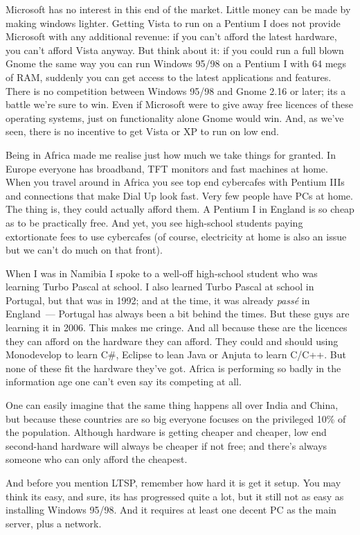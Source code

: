 \documentclass{book}
\begin{document}
Microsoft has no interest in this end of the market. Little money can
be made by making windows lighter. Getting Vista to run on a Pentium I
does not provide Microsoft with any additional revenue: if you can't
afford the latest hardware, you can't afford Vista anyway. But think
about it: if you could run a full blown Gnome the same way you can run
Windows 95/98 on a Pentium I with 64 megs of RAM, suddenly you can get
access to the latest applications and features. There is no
competition between Windows 95/98 and Gnome 2.16 or later; its a
battle we're sure to win. Even if Microsoft were to give away free
licences of these operating systems, just on functionality alone Gnome
would win. And, as we've seen, there is no incentive to get Vista or
XP to run on low end.

Being in Africa made me realise just how much we take things for
granted. In Europe everyone has broadband, TFT monitors and fast
machines at home. When you travel around in Africa you see top end
cybercafes with Pentium IIIs and connections that make Dial Up look
fast. Very few people have PCs at home. The thing is, they could
actually afford them. A Pentium I in England is so cheap as to be
practically free. And yet, you see high-school students paying
extortionate fees to use cybercafes (of course, electricity at home is
also an issue but we can't do much on that front).

When I was in Namibia I spoke to a well-off high-school student who
was learning Turbo Pascal at school. I also learned Turbo Pascal at
school in Portugal, but that was in 1992; and at the time, it was already
\emph{pass\'e} in England~--- Portugal has always been a bit behind
the times. But these guys are learning it in 2006. This makes me
cringe. And all because these are the licences they can afford on the
hardware they can afford. They could and should using Monodevelop to
learn C\#, Eclipse to lean Java or Anjuta to learn C/C++. But none of
these fit the hardware they've got. Africa is performing so badly in
the information age one can't even say its competing at all.

One can easily imagine that the same thing happens all over India and
China, but because these countries are so big everyone focuses on the
privileged 10\% of the population. Although hardware is getting
cheaper and cheaper, low end second-hand hardware will always be
cheaper if not free; and there's always someone who can only afford
the cheapest.

And before you mention LTSP, remember how hard it is get it setup. You
may think its easy, and sure, its has progressed quite a lot, but it
still not as easy as installing Windows 95/98. And it requires at
least one decent PC as the main server, plus a network.
\end{document}
